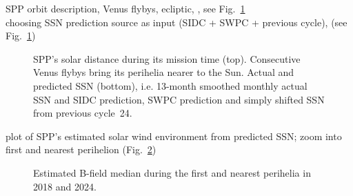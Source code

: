 SPP orbit description, Venus flybys, ecliptic, \citep{Fox2015}, see Fig.~\ref{fig:SPP_orbit_predicted_SSN_overview_b_plot}\\
choosing SSN prediction source as input (SIDC + SWPC + previous cycle), (see Fig.~\ref{fig:SPP_orbit_predicted_SSN_overview_b_plot})\\
\begin{figure}
	\caption{SPP's solar distance during its mission time (top). Consecutive Venus flybys bring its perihelia nearer to the Sun. Actual and predicted SSN (bottom), i.e. 13-month smoothed monthly actual SSN and SIDC prediction, SWPC prediction and simply shifted SSN from previous cycle~24.}
	\label{fig:SPP_orbit_predicted_SSN_overview_b_plot}
\end{figure}

plot of SPP's estimated solar wind environment from predicted SSN; zoom into first and nearest perihelion (Fig.~\ref{fig:SPP_perihelia_prediction_plot})\\
\begin{figure}
	\caption{Estimated B-field median during the first and nearest perihelia in 2018 and 2024.}
	\label{fig:SPP_perihelia_prediction_plot}
\end{figure}

